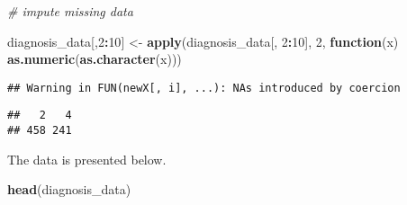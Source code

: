 \documentclass[]{article}
\newenvironment{Shaded}{\begin{snugshade}}{\end{snugshade}}
\newcommand{\KeywordTok}[1]{\textcolor[rgb]{0.13,0.29,0.53}{\textbf{#1}}}
\newcommand{\DataTypeTok}[1]{\textcolor[rgb]{0.13,0.29,0.53}{#1}}
\newcommand{\DecValTok}[1]{\textcolor[rgb]{0.00,0.00,0.81}{#1}}
\newcommand{\StringTok}[1]{\textcolor[rgb]{0.31,0.60,0.02}{#1}}
\newcommand{\CommentTok}[1]{\textcolor[rgb]{0.56,0.35,0.01}{\textit{#1}}}
\newcommand{\OtherTok}[1]{\textcolor[rgb]{0.56,0.35,0.01}{#1}}
\newcommand{\ControlFlowTok}[1]{\textcolor[rgb]{0.13,0.29,0.53}{\textbf{#1}}}
\newcommand{\OperatorTok}[1]{\textcolor[rgb]{0.81,0.36,0.00}{\textbf{#1}}}
\newcommand{\NormalTok}[1]{#1}
\begin{document}
\begin{Shaded}
\begin{Highlighting}[]
\CommentTok{# impute missing data}

\NormalTok{diagnosis_data[,}\DecValTok{2}\OperatorTok{:}\DecValTok{10}\NormalTok{] <-}\StringTok{ }\KeywordTok{apply}\NormalTok{(diagnosis_data[, }\DecValTok{2}\OperatorTok{:}\DecValTok{10}\NormalTok{], }\DecValTok{2}\NormalTok{, }\ControlFlowTok{function}\NormalTok{(x) }\KeywordTok{as.numeric}\NormalTok{(}\KeywordTok{as.character}\NormalTok{(x)))}
\end{Highlighting}
\end{Shaded}

\begin{verbatim}
## Warning in FUN(newX[, i], ...): NAs introduced by coercion
\end{verbatim}

\begin{Shaded}
\end{Shaded}

\begin{verbatim}
##   2   4 
## 458 241
\end{verbatim}

The data is presented below.

\begin{Shaded}
\begin{Highlighting}[]
\KeywordTok{head}\NormalTok{(diagnosis_data)}
\end{Highlighting}
\end{Shaded}
\end{document}
